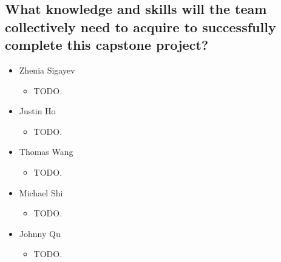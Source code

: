 \documentclass[12pt]{article}
\begin{document}
  \subsection{What knowledge and skills will the team collectively need to acquire to
    successfully complete this capstone project?}
  \begin{itemize}
    \item Zhenia Sigayev
      \begin{itemize}[label=$\circ$]
        \item TODO.
      \end{itemize}
    \item Justin Ho
      \begin{itemize}[label=$\circ$]
        \item TODO.
      \end{itemize}
    \item Thomas Wang
      \begin{itemize}[label=$\circ$]
        \item TODO.
      \end{itemize}
    \item Michael Shi
      \begin{itemize}[label=$\circ$]
        \item TODO.
      \end{itemize}
    \item Johnny Qu
      \begin{itemize}[label=$\circ$]
        \item TODO.
      \end{itemize}
  \end{itemize}
\end{document}
